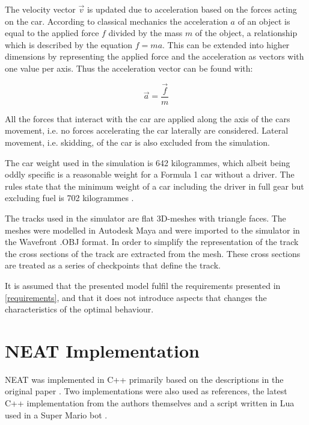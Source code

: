 The velocity vector $\vec{v}$ is updated due to acceleration based on the forces acting on the car. According to classical mechanics the acceleration $a$ of an object is equal to the applied force $f$ divided by the mass $m$ of the object, a relationship which is described by the equation $f = ma$. This can be extended into higher dimensions by representing the applied force and the acceleration as vectors with one value per axis. Thus the acceleration vector can be found with:

\begin{equation}
    \vec{a} = \frac{\vec{f}}{m}  
\end{equation}

\noindent
All the forces that interact with the car are applied along the axis of the cars movement, i.e. no forces accelerating the car laterally are considered. Lateral movement, i.e. skidding, of the car is also excluded from the simulation.




The car weight used in the simulation is 642 kilogrammes, which albeit being oddly specific is a reasonable weight for a Formula 1 car without a driver. The rules state that the minimum weight of a car including the driver in full gear but excluding fuel is 702 kilogrammes \cite{f1_weight}.

The tracks used in the simulator are flat 3D-meshes with triangle faces. The meshes were modelled in Autodesk Maya and were imported to the simulator in the Wavefront .OBJ format. In order to simplify the representation of the track the cross sections of the track are extracted from the mesh. These cross sections are treated as a series of checkpoints that define the track.  

It is assumed that the presented model fulfil the requirements presented in \ref{requirements}, and that it does not introduce aspects that changes the characteristics of the optimal behaviour.


\section{NEAT Implementation}

NEAT was implemented in C++ primarily based on the descriptions in the original paper \cite{stanley:neat}. Two implementations were also used as references, the latest C++ implementation from the authors themselves \cite{neat_source} and a script written in Lua used in a Super Mario bot \cite{mario_source}. 

